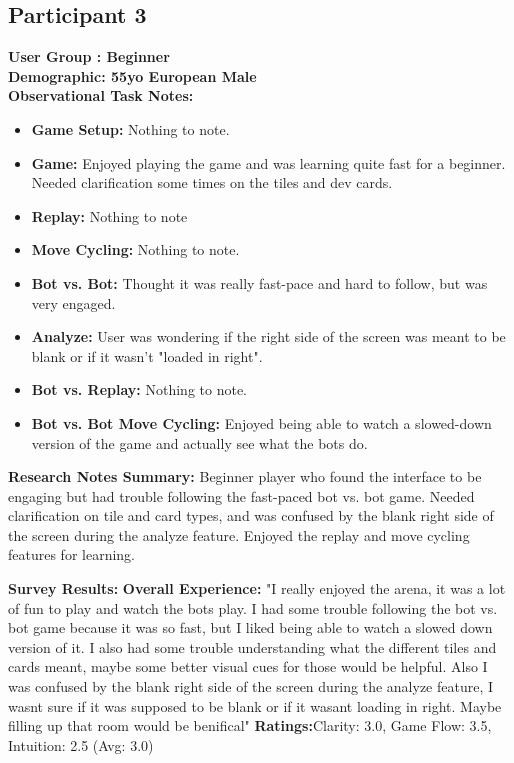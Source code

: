 \documentclass[12pt]{article}
\begin{document}
\subsection{Participant 3}
\textbf {User Group : Beginner} \\
\textbf {Demographic: 55yo European Male} \\
\textbf{Observational Task Notes:}
\begin{itemize}
    \item \textbf{Game Setup:} Nothing to note.
    \item \textbf{Game:} Enjoyed playing the game and was learning quite fast for a beginner. Needed clarification some times on the tiles and dev cards.
    \item \textbf{Replay:} Nothing to note
    \item \textbf{Move Cycling:} Nothing to note.
    \item \textbf{Bot vs. Bot:} Thought it was really fast-pace and hard to follow, but was very engaged.
    \item \textbf{Analyze:} User was wondering if the right side of the screen was meant to be blank or if it wasn't "loaded in right".
    \item \textbf{Bot vs. Replay:} Nothing to note.
    \item \textbf{Bot vs. Bot Move Cycling:} Enjoyed being able to watch a slowed-down version of the game and actually see what the bots do.
\end{itemize}
\textbf{Research Notes Summary:} Beginner player who found the interface to be engaging but had trouble following the fast-paced bot vs. bot game. Needed clarification on tile and card types, and was confused by the blank right side of the screen during the analyze feature. Enjoyed the replay and move cycling features for learning.

\textbf{Survey Results:}
\subitem \textbf{Overall Experience:} "I really enjoyed the arena, it was a lot of fun to play and watch the bots play. I had some trouble following the bot vs. bot game because it was so fast, but I liked being able to watch a slowed down version of it. I also had some trouble understanding what the different tiles and cards meant, maybe some better visual cues for those would be helpful. Also I was confused by the blank right side of the screen during the analyze feature, I wasnt sure if it was supposed to be blank or if it wasant loading in right. Maybe filling up that room would be benifical"
\subitem \textbf{Ratings:}Clarity: 3.0, Game Flow: 3.5, Intuition: 2.5 (Avg: 3.0)
\end{document}
